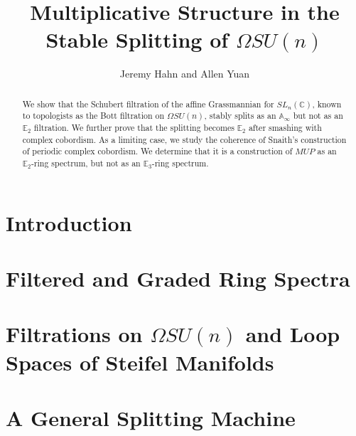 \documentclass[reqno, oneside]{amsart}
\theoremstyle{definition}
\theoremstyle{plain}
\begin{document}
\title{Multiplicative Structure in the Stable Splitting of $\Omega SU(n)$}
\author{Jeremy Hahn and Allen Yuan}

\begin{abstract}
We show that the Schubert filtration of the affine Grassmannian for $SL_n(\mathbb{C})$, known to topologists as the Bott filtration on $\Omega SU(n)$, stably splits as an $\mathbb{A}_\infty$ but not as an $\mathbb{E}_2$ filtration.  We further prove that the splitting becomes $\mathbb{E}_2$ after smashing with complex cobordism.  As a limiting case, we study the coherence of Snaith's construction of periodic complex cobordism.  We determine that it is a construction of $MUP$ as an $\mathbb{E}_2$-ring spectrum, but not as an $\mathbb{E}_3$-ring spectrum.
\end{abstract}





\setcounter{tocdepth}{1}
\maketitle

\tableofcontents



\section{Introduction}



\section{Filtered and Graded Ring Spectra} \label{sec:FilGra}



\section{Filtrations on \texorpdfstring{$\Omega SU(n)$}{Loops SU(n)} and Loop Spaces of Steifel Manifolds}



\section{A General Splitting Machine}
\end{document}
